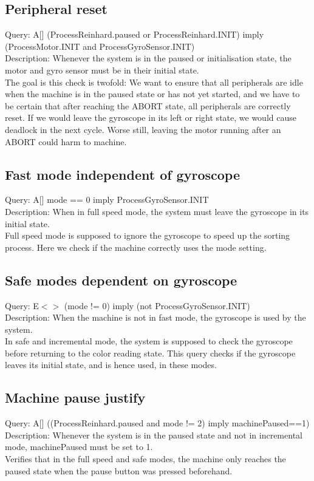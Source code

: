 \documentclass[a4paper,oneside,11pt]{article}
\begin{document}
\subsection{Peripheral reset}
Query: A[] (ProcessReinhard.paused or ProcessReinhard.INIT) imply (ProcessMotor.INIT and ProcessGyroSensor.INIT) \\
Description: Whenever the system is in the paused or initialisation state, the motor and gyro sensor must be in their initial state. \\
The goal is this check is twofold: We want to ensure that all peripherals are idle when the machine is in the paused state or has not yet started, and we have to be certain that after reaching the ABORT state, all peripherals are correctly reset. If we would leave the gyroscope in its left or right state, we would cause deadlock in the next cycle. Worse still, leaving the motor running after an ABORT could harm to machine.

\subsection{Fast mode independent of gyroscope}
Query: A[] mode == 0 imply ProcessGyroSensor.INIT \\
Description: When in full speed mode, the system must leave the gyroscope in its initial state. \\
Full speed mode is supposed to ignore the gyroscope to speed up the sorting process. Here we check if the machine correctly uses the mode setting.

\subsection{Safe modes dependent on gyroscope}
Query: E$<>$ (mode != 0) imply (not ProcessGyroSensor.INIT) \\
Description: When the machine is not in fast mode, the gyroscope is used by the system. \\
In safe and incremental mode, the system is supposed to check the gyroscope before returning to the color reading state. This query checks if the gyroscope leaves its initial state, and is hence used, in these modes.

\subsection{Machine pause justify}
Query: A[] ((ProcessReinhard.paused and mode != 2) imply machinePaused==1) \\
Description: Whenever the system is in the paused state and not in incremental mode, machinePaused must be set to 1. \\
Verifies that in the full speed and safe modes, the machine only reaches the paused state when the pause button was pressed beforehand.
\end{document}
